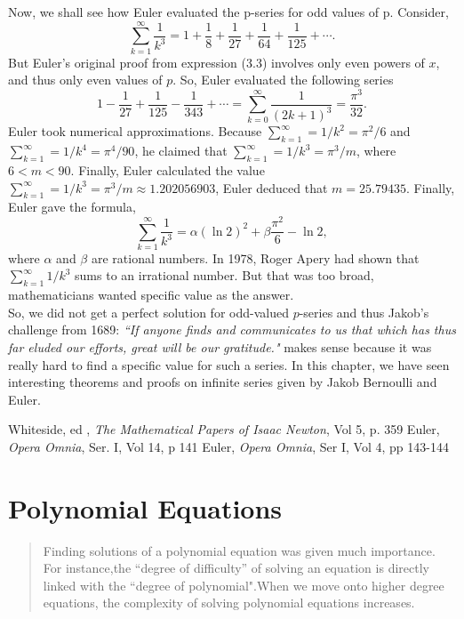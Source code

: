 \documentclass[a4paper,reqno,11pt]{book}
\theoremstyle{plain}%
\theoremstyle{definition}
\begin{document}
Now, we shall see how Euler evaluated the p-series for odd values of p. Consider,\\
$$\sum_{k=1}^{\infty}\frac{1}{k^3} = 1 + \frac{1}{8} + \frac{1}{27} + \frac{1}{64} + \frac{1}{125} + \cdots. $$
But Euler's original proof from expression (3.3) involves only even powers of $x$, and thus only even values of $p$. So, Euler evaluated the following series
$$1 - \frac{1}{27} + \frac{1}{125} - \frac{1}{343} + \cdots = \sum_{k=0}^{\infty} \frac{1}{(2k+1)^3} = \frac{\pi^3}{32}.$$
Euler took numerical approximations. Because $\sum_{k=1}^{\infty} =1/k^2 = \pi^2/6$ and $\sum_{k=1}^{\infty} =1/k^4 = \pi^4/90$, he claimed that $\sum_{k=1}^{\infty} =1/k^3 = \pi^3/m$, where $6 < m < 90.$ Finally, Euler calculated the value $\sum_{k=1}^{\infty} =1/k^3 = \pi^3/m \approx  1.202056903$, Euler deduced that $m = 25.79435$. Finally, Euler gave the formula,\\
$$\sum_{k=1}^{\infty}\frac{1}{k^3} = \alpha(\ln2)^2 + \beta\frac{\pi^2}{6} -\ln2,$$
where $\alpha$ and $\beta$ are rational numbers\cite{ref 3}. In 1978, Roger Apery had shown that $\sum_{k=1}^{\infty}1/k^3$ sums to an irrational number. But that was too broad, mathematicians wanted specific value as the answer.\\
\indent So, we did not get a perfect solution for odd-valued $p$-series and thus Jakob's challenge from 1689: \textit{``If anyone finds and 
communicates to us that which has thus far eluded our efforts, great will be our gratitude."} makes sense because it was really hard to find a specific value for such a series. In this chapter, we have seen interesting theorems and proofs on infinite series given by Jakob Bernoulli and Euler.\\
\begin{thebibliography}{99}
		
		
		 Whiteside, ed , \textit{The Mathematical Papers of Isaac Newton}, Vol 5, p. 359
		 Euler, \textit{Opera Omnia}, Ser. I, Vol 14, p 141 
		 Euler, \textit{Opera Omnia}, Ser I, Vol 4, pp 143-144 
		
		
		
	\end{thebibliography}

\chapter{Polynomial Equations}
\begin{abstract}
		Finding solutions of a polynomial equation was given much importance. For instance,the ``degree of difficulty” of solving an equation is directly linked with the ``degree of polynomial".When we move onto higher degree equations, the complexity of solving polynomial equations increases.
	\end{abstract}
	
\end{document}
